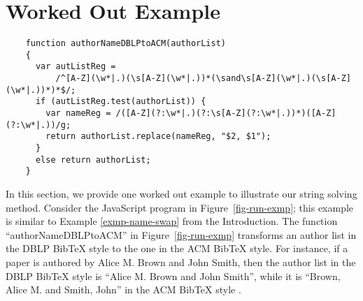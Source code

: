 
\section{Worked Out Example}\label{sec:mot}


\begin{figure*}[htbp]
\begin{center}
{
\small
\begin{verbatim}
    function authorNameDBLPtoACM(authorList)
    {
      var autListReg = 
          /^[A-Z](\w*|.)(\s[A-Z](\w*|.))*(\sand\s[A-Z](\w*|.)(\s[A-Z](\w*|.))*)*$/;
      if (autListReg.test(authorList)) {
        var nameReg = /([A-Z](?:\w*|.)(?:\s[A-Z](?:\w*|.))*)([A-Z](?:\w*|.))/g;
        return authorList.replace(nameReg, "$2, $1");
      }
      else return authorList;
    }
\end{verbatim}
}
\end{center}
\caption{Change the author list from the DBLP format to the ACM format}
\label{fig-run-exmp}
\end{figure*}



In this section, we provide one worked out example to illustrate our string
solving method. 
Consider the JavaScript program in Figure~\ref{fig-run-exmp}; this example is
similar to Example \ref{exmp-name-swap} from the Introduction.
The function ``authorNameDBLPtoACM'' in 
Figure~\ref{fig-run-exmp} transforms %
an author list in the DBLP BibTeX style to the one in the ACM BibTeX style. For instance,  if a paper is authored by Alice M. Brown and John Smith, then the author list in the DBLP BibTeX style is ``Alice M. Brown and John Smith'', while it is ``Brown, Alice M. and Smith, John'' in the ACM BibTeX style . 

